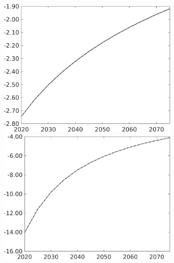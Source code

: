 \begin{figure}[h!!]
\begin{subfigure}{0.75\textwidth}
\begin{minipage}[]{0.32\textwidth}
			\end{minipage}
			\begin{minipage}[]{0.32\textwidth}
				\includegraphics[width=1\textwidth]{../../codding_model/own_basedOnFried/optimalPol_010922_revision/figures/all_13Sept22/PerdifNoTauf_Equlab_regime0_CompTaul_EY_spillover0_nsk0_xgr0_knspil0_sep0_LFlimit0_emsbase0_countec0_GovRev0_etaa0.79_lgd0.png}
			\end{minipage}
		\begin{minipage}[]{0.32\textwidth}
		\includegraphics[width=1\textwidth]{../../codding_model/own_basedOnFried/optimalPol_010922_revision/figures/all_13Sept22/PerdifNoTauf_Equlab_regime0_CompTaul_snS_spillover0_nsk0_xgr0_knspil0_sep0_LFlimit0_emsbase0_countec0_GovRev0_etaa0.79_lgd0.png}

\end{minipage}
\end{subfigure}
\end{figure}
